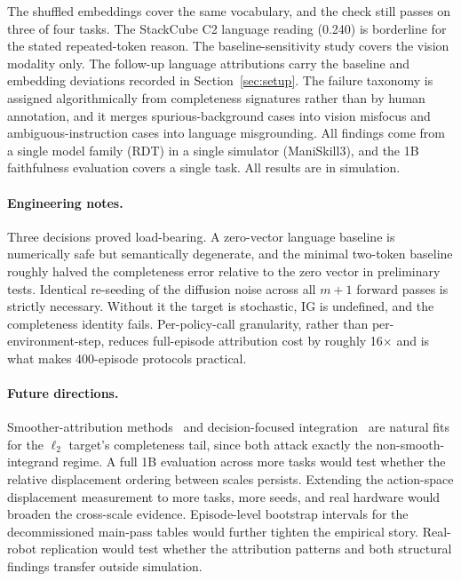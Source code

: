 \documentclass{article}
\begin{document}
The shuffled embeddings cover the same vocabulary, and the check still passes on three of four tasks.
The StackCube C2 language reading (0.240) is borderline for the stated repeated-token reason.
The baseline-sensitivity study covers the vision modality only.
The follow-up language attributions carry the baseline and embedding deviations recorded in Section~\ref{sec:setup}.
The failure taxonomy is assigned algorithmically from completeness signatures rather than by human annotation, and it merges spurious-background cases into vision misfocus and ambiguous-instruction cases into language misgrounding.
All findings come from a single model family (RDT) in a single simulator (ManiSkill3), and the 1B faithfulness evaluation covers a single task.
All results are in simulation.

\paragraph{Engineering notes.}
Three decisions proved load-bearing.
A zero-vector language baseline is numerically safe but semantically degenerate, and the minimal two-token baseline roughly halved the completeness error relative to the zero vector in preliminary tests.
Identical re-seeding of the diffusion noise across all $m{+}1$ forward passes is strictly necessary.
Without it the target is stochastic, IG is undefined, and the completeness identity fails.
Per-policy-call granularity, rather than per-environment-step, reduces full-episode attribution cost by roughly 16$\times$ and is what makes 400-episode protocols practical.

\paragraph{Future directions.}
Smoother-attribution methods~\cite{jha2021smoother,jha2022shaping} and decision-focused integration~\cite{walker2024idg} are natural fits for the $\ell_2$ target's completeness tail, since both attack exactly the non-smooth-integrand regime.
A full 1B evaluation across more tasks would test whether the relative displacement ordering between scales persists.
Extending the action-space displacement measurement to more tasks, more seeds, and real hardware would broaden the cross-scale evidence.
Episode-level bootstrap intervals for the decommissioned main-pass tables would further tighten the empirical story.
Real-robot replication would test whether the attribution patterns and both structural findings transfer outside simulation.
\end{document}
